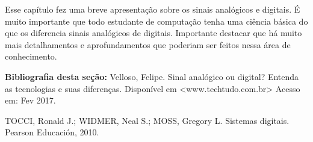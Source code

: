 Esse capítulo fez uma breve apresentação sobre os sinais analógicos e digitais. É muito importante que todo estudante de computação tenha uma ciência básica do que os diferencia sinais analógicos de digitais. Importante destacar que há muito mais detalhamentos e aprofundamentos que poderiam ser feitos nessa área de conhecimento. 


\textbf{Bibliografia desta seção:}
Velloso, Felipe. Sinal analógico ou digital? Entenda as tecnologias e suas diferenças. Disponível em <www.techtudo.com.br> Acesso em: Fev 2017.

TOCCI, Ronald J.; WIDMER, Neal S.; MOSS, Gregory L. Sistemas digitais. Pearson Educación, 2010.




